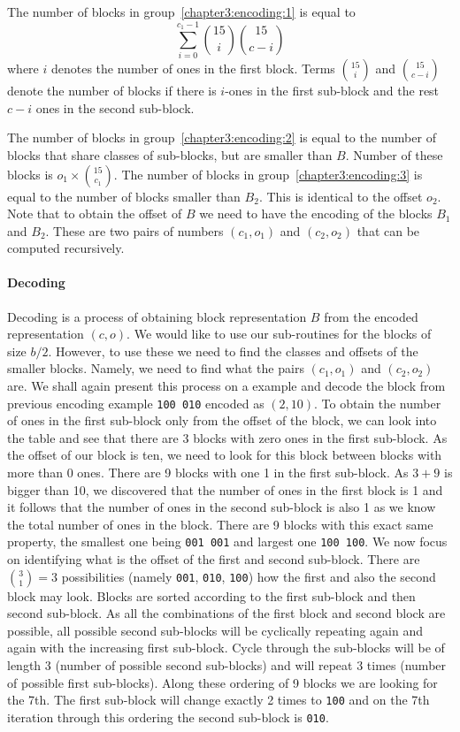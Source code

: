 The number of blocks in group~\ref{chapter3:encoding:1} is equal to
$$\sum_{i=0}^{c_1-1} {15\choose i} {15\choose c-i}$$ where $i$ denotes the number
of ones in the first block. Terms ${15\choose i}$ and ${15\choose c-i}$ denote the
number of blocks if there is $i$-ones in the first sub-block and the rest $c-i$ ones
in the second sub-block.

The number of blocks in group~\ref{chapter3:encoding:2} is equal to the number of blocks that
share classes of sub-blocks, but are smaller than $B$. Number of these blocks is $o_1\times {15\choose c_1}$.
The number of blocks in group~\ref{chapter3:encoding:3} is equal to the number of blocks smaller 
than $B_2$. This is identical to the offset $o_2$. Note that to obtain the offset of $B$
we need to have the encoding of the blocks $B_1$ and $B_2$. These are two pairs of numbers
$(c_1, o_1)$ and $(c_2, o_2)$ that can be computed recursively.

\paragraph{Decoding}

Decoding is a process of obtaining block representation $B$ from the encoded
representation $(c, o)$. We would like to use our sub-routines for the blocks
of size $b/2$. However, to use these we need to find the classes and offsets of
the smaller blocks. Namely, we need to find what the pairs $(c_1, o_1)$ and
$(c_2, o_2)$ are. We shall again present this process on a example and decode
the block from previous encoding example {\tt 100 010} encoded as $(2, 10)$.
To obtain the number of ones in the first sub-block only from the offset of the
block, we can look into the table and see that there are 3 blocks with zero ones
in the first sub-block. As the offset of our block is ten, we need to look for this
block between blocks with more than 0 ones. There are 9 blocks with one 1 in the first
sub-block. As $3+9$ is bigger than 10, we discovered that the number of ones in the
first block is 1 and it follows that the number of ones in the second sub-block is
also 1 as we know the total number of ones in the block. There are 9 blocks with
this exact same property, the smallest one being {\tt 001 001} and largest one
{\tt 100 100}. We now focus on identifying what is the offset of the first and second
sub-block. There are ${3 \choose 1} = 3$ possibilities (namely {\tt 001}, {\tt 010},
{\tt 100}) how the first and also the second block may look. Blocks are sorted according
to the first sub-block and then second sub-block. As all the combinations of the first
block and second block are possible, all possible second sub-blocks will be cyclically
repeating again and again with the increasing first sub-block. Cycle through
the sub-blocks will be of length 3 (number of possible second sub-blocks) and will repeat
3 times (number of possible first sub-blocks). Along these ordering of 9 blocks we are
looking for the 7th. The first sub-block will change exactly 2 times to {\tt 100} and on the
7th iteration through this ordering the second sub-block is {\tt 010}.

